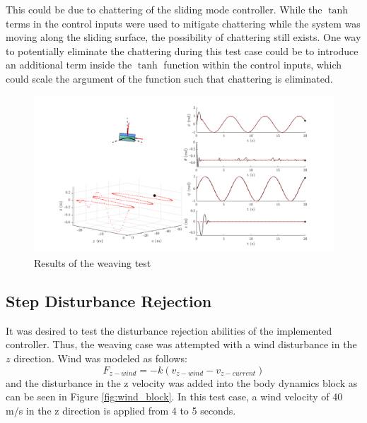 \documentclass[12pt]{article}
\begin{document}
This could be due to chattering of the sliding mode controller. While the $\tanh$ terms in the control inputs were used to mitigate chattering while the system was moving along the sliding surface, the possibility of chattering still exists. One way to potentially eliminate the chattering during this test case could be to introduce an additional term inside the $\tanh$ function within the control inputs, which could scale the argument of the function such that chattering is eliminated.

\begin{center}
\begin{figure}[H]
\captionsetup{width=1\textwidth}
\centering
\includegraphics[width=1\textwidth]{weaving.png}
\caption{\label{fig:weaving}Results of the weaving test}
\end{figure}
\end{center}

\subsection{Step Disturbance Rejection}
It was desired to test the disturbance rejection abilities of the implemented controller. Thus, the weaving case was attempted with a wind disturbance in the $z$ direction. Wind was modeled as follows:
\begin{equation}
F_{z-wind} = -k(v_{z-wind} - v_{z-current})
\end{equation}
and the disturbance in the z velocity was added into the body dynamics block as can be seen in Figure \ref{fig:wind_block}. In this test case, a wind velocity of 40 m/s in the z direction is applied from 4 to 5 seconds. 
\end{document}
